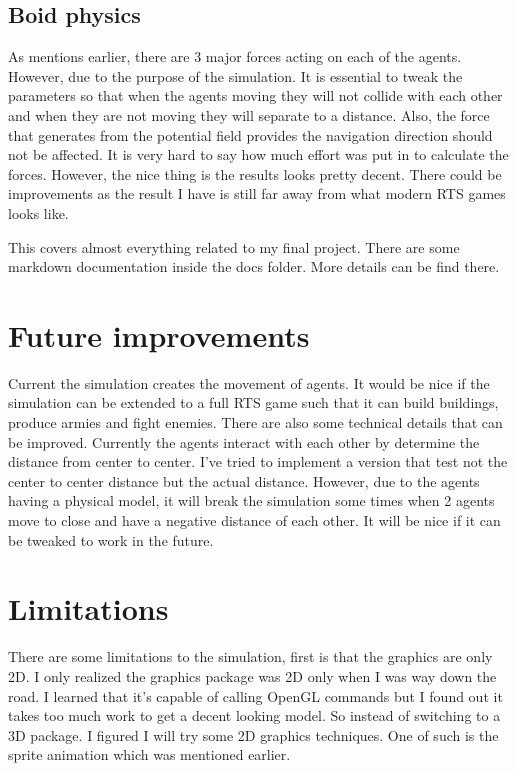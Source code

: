 \documentclass[letterpaper, 12pt]{article}
\begin{document}
\subsection*{Boid physics}
As mentions earlier, there are 3 major forces acting on each of the agents. However, due to the purpose of the simulation. It is essential to tweak the parameters so that when the agents moving they will not collide with each other and when they are not moving they will separate to a distance. Also, the force that generates from the potential field provides the navigation direction should not be affected. It is very hard to say how much effort was put in to calculate the forces. However, the nice thing is the results looks pretty decent. There could be improvements as the result I have is still far away from what modern RTS games looks like.

This covers almost everything related to my final project. There are some markdown documentation inside the docs folder. More details can be find there. 

\section*{Future improvements}
Current the simulation creates the movement of agents. It would be nice if the simulation can be extended to a full RTS game such that it can build buildings, produce armies and fight enemies. There are also some technical details that can be improved. Currently the agents interact with each other by determine the distance from center to center. I've tried to implement a version that test not the center to center distance but the actual distance. However, due to the agents having a physical model, it will break the simulation some times when 2 agents move to close and have a negative distance of each other. It will be nice if it can be tweaked to work in the future. 

\section*{Limitations}
There are some limitations to the simulation, first is that the graphics are only 2D. I only realized the graphics package was 2D only when I was way down the road. I learned that it's capable of calling OpenGL commands but I found out it takes too much work to get a decent looking model. So instead of switching to a 3D package. I figured I will try some 2D graphics techniques. One of such is the sprite animation which was mentioned earlier. 
\end{document}
